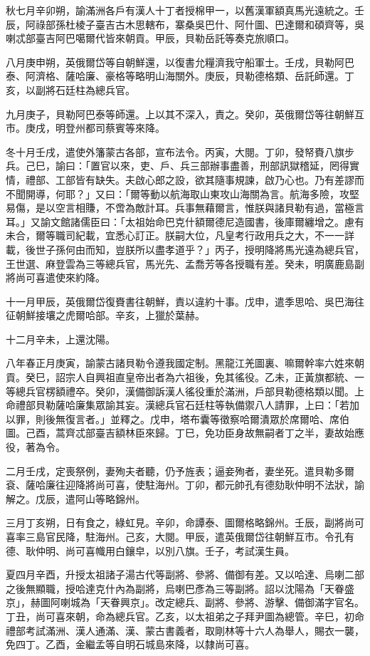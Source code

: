 \begin{pinyinscope}
秋七月辛卯朔，諭滿洲各戶有漢人十丁者授棉甲一，以舊漢軍額真馬光遠統之。壬辰，阿祿部孫杜棱子臺吉古木思轄布，寨桑吳巴什、阿什圖、巴達爾和碩齊等，吳喇忒部臺吉阿巴噶爾代皆來朝貢。甲辰，貝勒岳託等奏克旅順口。

八月庚申朔，英俄爾岱等自朝鮮還，以復書允糧濟我守船軍士。壬戌，貝勒阿巴泰、阿濟格、薩哈廉、豪格等略明山海關外。庚辰，貝勒德格類、岳託師還。丁亥，以副將石廷柱為總兵官。

九月庚子，貝勒阿巴泰等師還。上以其不深入，責之。癸卯，英俄爾岱等往朝鮮互市。庚戌，明登州都司蔡賓等來降。

冬十月壬戌，遣使外籓蒙古各部，宣布法令。丙寅，大閱。丁卯，發帑賚八旗步兵。己巳，諭曰：「置官以來，吏、戶、兵三部辦事盡善，刑部訊獄稽延，罔得實情，禮部、工部皆有缺失。夫啟心郎之設，欲其隨事規諫，啟乃心也。乃有差謬而不聞開導，何耶？」又曰：「爾等動以航海取山東攻山海關為言。航海多險，攻堅易傷，是以空言相賺，不啻為敵計耳。兵事無藉爾言，惟朕與諸貝勒有過，當極言耳。」又諭文館諸儒臣曰：「太祖始命巴克什額爾德尼造國書，後庫爾纏增之。慮有未合，爾等職司紀載，宜悉心訂正。朕嗣大位，凡皇考行政用兵之大，不一一詳載，後世子孫何由而知，豈朕所以盡孝道乎？」丙子，授明降將馬光遠為總兵官，王世選、麻登雲為三等總兵官，馬光先、孟喬芳等各授職有差。癸未，明廣鹿島副將尚可喜遣使來約降。

十一月甲辰，英俄爾岱復賚書往朝鮮，責以違約十事。戊申，遣季思哈、吳巴海往征朝鮮接壤之虎爾哈部。辛亥，上獵於葉赫。

十二月辛未，上還沈陽。

八年春正月庚寅，諭蒙古諸貝勒令遵我國定制。黑龍江羌圖裏、嘛爾幹率六姓來朝貢。癸巳，詔宗人自興祖直皇帝出者為六祖後，免其徭役。乙未，正黃旗都統、一等總兵官楞額禮卒。癸卯，漢備御訴漢人徭役重於滿洲，戶部貝勒德格類以聞。上命禮部貝勒薩哈廉集眾諭其妄。漢總兵官石廷柱等執備禦八人請罪，上曰：「若加以罪，則後無復言者。」並釋之。戊申，塔布囊等徵察哈爾潰眾於席爾哈、席伯圖。己酉，蒿齊忒部臺吉額林臣來歸。丁巳，免功臣身故無嗣者丁之半，妻故始應役，著為令。

二月壬戌，定喪祭例，妻殉夫者聽，仍予旌表；逼妾殉者，妻坐死。遣貝勒多爾袞、薩哈廉往迎降將尚可喜，使駐海州。丁卯，都元帥孔有德劾耿仲明不法狀，諭解之。戊辰，遣阿山等略錦州。

三月丁亥朔，日有食之，綠虹見。辛卯，命譚泰、圖爾格略錦州。壬辰，副將尚可喜率三島官民降，駐海州。己亥，大閱。甲辰，遣英俄爾岱往朝鮮互市。令孔有德、耿仲明、尚可喜幟用白鑲皁，以別八旗。壬子，考試漢生員。

夏四月辛酉，升授太祖諸子湯古代等副將、參將、備御有差。又以哈達、烏喇二部之後無顯職，授哈達克什內為副將，烏喇巴彥為三等副將。詔以沈陽為「天眷盛京」，赫圖阿喇城為「天眷興京」。改定總兵、副將、參將、游擊、備御滿字官名。丁丑，尚可喜來朝，命為總兵官。乙亥，以太祖弟之子拜尹圖為總管。辛巳，初命禮部考試滿洲、漢人通滿、漢、蒙古書義者，取剛林等十六人為舉人，賜衣一襲，免四丁。乙酉，金繼孟等自明石城島來降，以隸尚可喜。


\end{pinyinscope}
